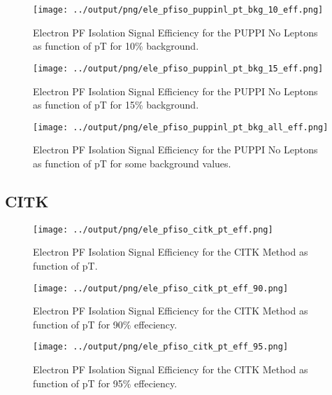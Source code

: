 \documentclass[11pt]{book}
\begin{document}
\begin{figure}[htb]
\centering
\texttt{[image: ../output/png/ele\_pfiso\_puppinl\_pt\_bkg\_10\_eff.png]}
\caption{Electron PF Isolation Signal Efficiency for the PUPPI No Leptons as function of pT for 10\% background.}
\label{fig:ele_pfiso_pt_bkg_puppinl_bkg_10_eff}
\end{figure}

\begin{figure}[htb]
\centering
\texttt{[image: ../output/png/ele\_pfiso\_puppinl\_pt\_bkg\_15\_eff.png]}
\caption{Electron PF Isolation Signal Efficiency for the PUPPI No Leptons as function of pT for 15\% background.}
\label{fig:ele_pfiso_pt_bkg_puppinl_bkg_15_eff}
\end{figure}

\begin{figure}[htb]
\centering
\texttt{[image: ../output/png/ele\_pfiso\_puppinl\_pt\_bkg\_all\_eff.png]}
\caption{Electron PF Isolation Signal Efficiency for the PUPPI No Leptons as function of pT for some background values.}
\label{fig:ele_pfiso_pt_bkg_puppinl_bkg_all_eff}
\end{figure}
\clearpage

\subsection{CITK}
\begin{figure}[htb]
\centering
\texttt{[image: ../output/png/ele\_pfiso\_citk\_pt\_eff.png]}
\caption{Electron PF Isolation Signal Efficiency for the CITK Method as function of pT.}
\label{fig:ele_pfiso_pt_eff_citk}
\end{figure}

\begin{figure}[htb]
\centering
\texttt{[image: ../output/png/ele\_pfiso\_citk\_pt\_eff\_90.png]}
\caption{Electron PF Isolation Signal Efficiency for the CITK Method as function of pT for 90\% effeciency.}
\label{fig:ele_pfiso_pt_eff_citk_eff_90}
\end{figure}

\begin{figure}[htb]
\centering
\texttt{[image: ../output/png/ele\_pfiso\_citk\_pt\_eff\_95.png]}
\caption{Electron PF Isolation Signal Efficiency for the CITK Method as function of pT for 95\% effeciency.}
\label{fig:ele_pfiso_pt_eff_citk_eff_95}
\end{figure}
\end{document}
